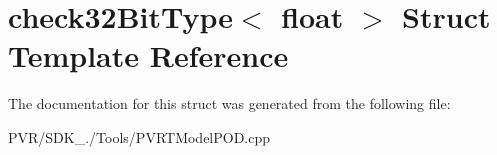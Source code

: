 \hypertarget{structcheck32_bit_type_3_01float_01_4}{\section{check32\+Bit\+Type$<$ float $>$ Struct Template Reference}
\label{structcheck32_bit_type_3_01float_01_4}
}


The documentation for this struct was generated from the following file\+:\begin{DoxyCompactItemize}
\item 
P\+V\+R/\+S\+D\+K\+\_./\+Tools/P\+V\+R\+T\+Model\+P\+O\+D.\+cpp\end{DoxyCompactItemize}
